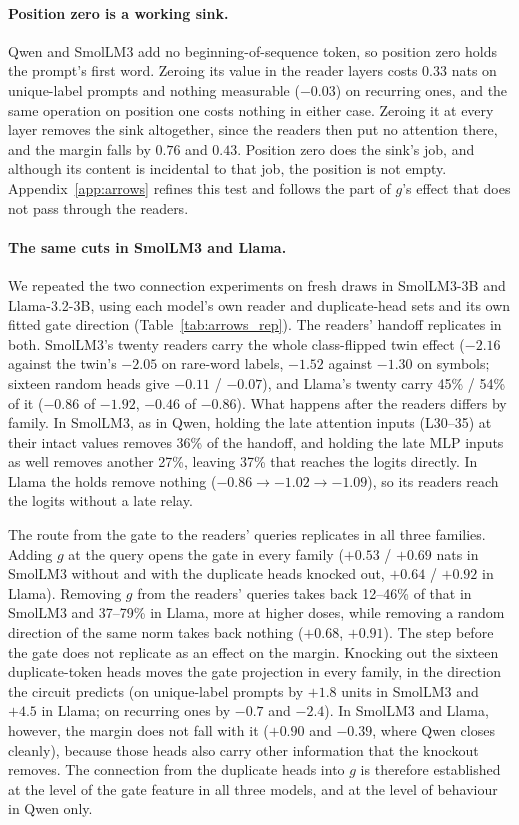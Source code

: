 \documentclass{article}
\begin{document}
\paragraph{Position zero is a working sink.} Qwen and SmolLM3 add no beginning-of-sequence token, so position zero holds the prompt's first word. Zeroing its value in the reader layers costs $0.33$ nats on unique-label prompts and nothing measurable ($-0.03$) on recurring ones, and the same operation on position one costs nothing in either case. Zeroing it at every layer removes the sink altogether, since the readers then put no attention there, and the margin falls by $0.76$ and $0.43$. Position zero does the sink's job, and although its content is incidental to that job, the position is not empty. Appendix~\ref{app:arrows} refines this test and follows the part of $g$'s effect that does not pass through the readers.

\paragraph{The same cuts in SmolLM3 and Llama.} We repeated the two connection experiments on fresh draws in SmolLM3-3B and Llama-3.2-3B, using each model's own reader and duplicate-head sets and its own fitted gate direction (Table~\ref{tab:arrows_rep}). The readers' handoff replicates in both. SmolLM3's twenty readers carry the whole class-flipped twin effect ($-2.16$ against the twin's $-2.05$ on rare-word labels, $-1.52$ against $-1.30$ on symbols; sixteen random heads give $-0.11$ / $-0.07$), and Llama's twenty carry 45\% / 54\% of it ($-0.86$ of $-1.92$, $-0.46$ of $-0.86$). What happens after the readers differs by family. In SmolLM3, as in Qwen, holding the late attention inputs (L30--35) at their intact values removes 36\% of the handoff, and holding the late MLP inputs as well removes another 27\%, leaving 37\% that reaches the logits directly. In Llama the holds remove nothing ($-0.86 \to -1.02 \to -1.09$), so its readers reach the logits without a late relay.

The route from the gate to the readers' queries replicates in all three families. Adding $g$ at the query opens the gate in every family ($+0.53$ / $+0.69$ nats in SmolLM3 without and with the duplicate heads knocked out, $+0.64$ / $+0.92$ in Llama). Removing $g$ from the readers' queries takes back 12--46\% of that in SmolLM3 and 37--79\% in Llama, more at higher doses, while removing a random direction of the same norm takes back nothing ($+0.68$, $+0.91$). The step before the gate does not replicate as an effect on the margin. Knocking out the sixteen duplicate-token heads moves the gate projection in every family, in the direction the circuit predicts (on unique-label prompts by $+1.8$ units in SmolLM3 and $+4.5$ in Llama; on recurring ones by $-0.7$ and $-2.4$). In SmolLM3 and Llama, however, the margin does not fall with it ($+0.90$ and $-0.39$, where Qwen closes cleanly), because those heads also carry other information that the knockout removes. The connection from the duplicate heads into $g$ is therefore established at the level of the gate feature in all three models, and at the level of behaviour in Qwen only.
\end{document}

